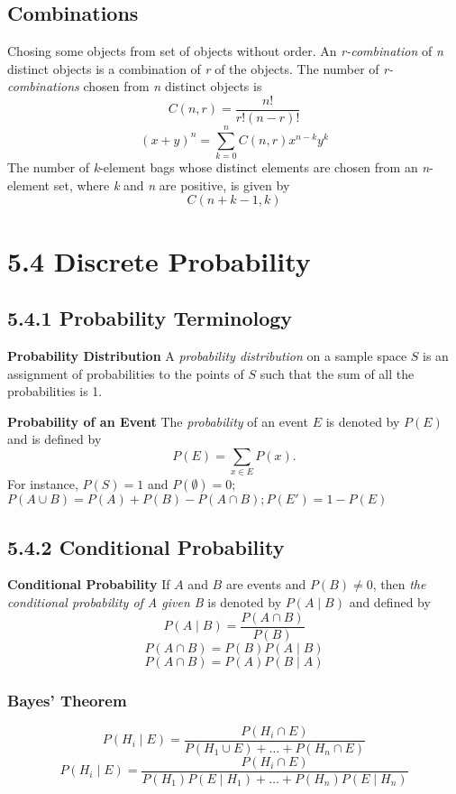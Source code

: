 \documentclass[10pt,twocolumn]{article}
\begin{document}
	\subsection*{Combinations}
	Chosing some objects from set of objects without order.
	An \textit{r-combination} of \textit{n} distinct objects is a combination of \textit{r} of the objects.  The number of \textit{r-combinations} chosen from \textit{n} distinct objects is
	\[C(n,r)=\frac{n!}{r!(n-r)!}\]
	\[(x+y)^n=\sum_{k=0}^nC(n,r)x^{n-k}y^k\]
	The number of \textit{k}-element bags whose distinct elements are chosen from an \textit{n}-element set, where \textit{k} and \textit{n} are positive, is given by
	\[C(n+k-1, k)\]


	\section*{5.4 Discrete Probability}

	\subsection*{5.4.1 Probability Terminology}

	\par\textbf{Probability Distribution} A \emph{probability distribution} on a sample space $S$ is an assignment of probabilities to the points of $S$ such that the sum of all the probabilities is 1.
	\par\noindent\textbf{Probability of an Event} The \emph{probability} of an event $E$ is denoted by $P(E)$ and is defined by
	\[P(E)=\sum_{x\in E}P(x).\]
	For instance, $P(S)=1$ and $P(\emptyset)=0$; $P(A\cup B)=P(A)+P(B)-P(A\cap B); P(E')=1-P(E)$
	
	\subsection*{5.4.2 Conditional Probability}
	
	\textbf{Conditional Probability} If $A$ and $B$ are events and $P(B)\neq0$, then \emph{the conditional probability of A given B} is denoted by $P(A\mid B)$ and defined by
	\[P(A\mid B)=\frac{P(A\cap B)}{P(B)}\]
	\[P(A\cap B)=P(B)P(A\mid B)\]
	\[P(A\cap B)=P(A)P(B\mid A)\]

	\subsubsection*{Bayes' Theorem}
	\[P(H_i\mid E)=\frac{P(H_i\cap E)}{P(H_1\cup E)+\ldots+P(H_n\cap E)}\]
	\[P(H_i\mid E)=\frac{P(H_i\cap E)}{P(H_1)P(E\mid H_1)+\ldots+P(H_n)P(E\mid  H_n)}\]
	
\end{document}
